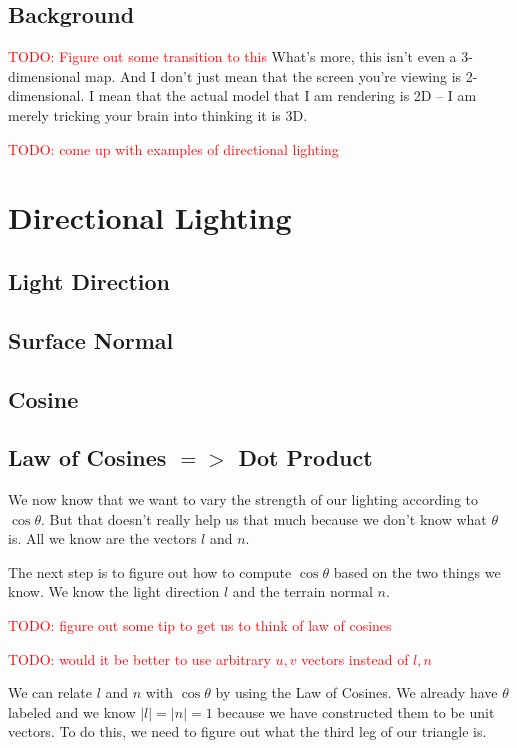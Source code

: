 \documentclass{article}
\newcommand\todo[1]{\textcolor{red}{TODO: #1}}
\begin{document}
\subsection{Background}

\todo{Figure out some transition to this}
What's more, this isn't even a 3-dimensional map.
And I don't just mean that the screen you're viewing is 2-dimensional.
I mean that the actual model that I am rendering is 2D -- I am merely tricking your brain into thinking it is 3D.

\todo{come up with examples of directional lighting}

\section{Directional Lighting}

\subsection{Light Direction}

\subsection{Surface Normal}

\subsection{Cosine}

\subsection{Law of Cosines $=>$ Dot Product}

We now know that we want to vary the strength of our lighting according to $\cos \theta$.
But that doesn't really help us that much because we don't know what $\theta$ is.
All we know are the vectors $l$ and $n$.

The next step is to figure out how to compute $\cos \theta$ based on the two things we know.
We know the light direction $l$ and the terrain normal $n$.

\todo{figure out some tip to get us to think of law of cosines}

\todo{would it be better to use arbitrary $u,v$ vectors instead of $l,n$}

We can relate $l$ and $n$ with $\cos \theta$ by using the Law of Cosines.
We already have $\theta$ labeled and we know $|l| = |n| = 1$ because we have constructed them to be unit vectors.
To do this, we need to figure out what the third leg of our triangle is.
\end{document}
